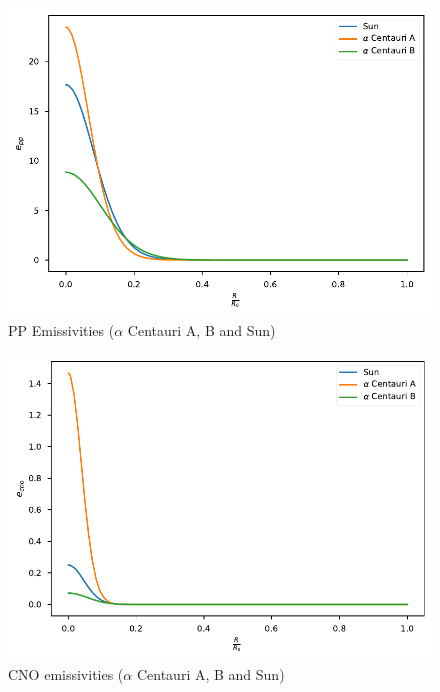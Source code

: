 \documentclass{aa}
\begin{document}
\begin{figure}
  \centering
  \includegraphics[width=\linewidth]{../figures/emissivities_pp.pdf}
  \caption{PP Emissivities ($\alpha$ Centauri A, B and Sun)}
  \label{fig:emissivities_pp}
\end{figure}
\begin{figure}
  \centering
  \includegraphics[width=\linewidth]{../figures/emissivities_cno.pdf}
  \caption{CNO emissivities ($\alpha$ Centauri A, B and Sun)}
  \label{fig:emissivities_cno}
\end{figure}
\end{document}
